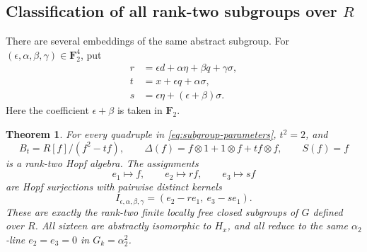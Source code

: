 \documentclass[11pt]{article}
\newtheorem{theorem}{Theorem}[section]
\theoremstyle{remark}
\newcommand{\F}{\mathbf F}
\begin{document}
\subsection{Classification of all rank-two subgroups over
\texorpdfstring{\(R\)}{R}}

There are several embeddings of the same abstract subgroup.  For
\((\epsilon,\alpha,\beta,\gamma)\in\F_2^4\), put
\begin{equation}\label{eq:subgroup-parameters}
\begin{aligned}
 r&=\epsilon d+\alpha\eta+\beta q+\gamma\sigma,\\
 t&=x+\epsilon q+\alpha\sigma,\\
 s&=\epsilon\eta+(\epsilon+\beta)\sigma.
\end{aligned}
\end{equation}
Here the coefficient \(\epsilon+\beta\) is taken in \(\F_2\).

\begin{theorem}\label{thm:subgroup-classification}
For every quadruple in \eqref{eq:subgroup-parameters}, \(t^2=2\), and
\[
 B_t=R[f]/(f^2-tf),\qquad
 \Delta(f)=f\otimes1+1\otimes f+t f\otimes f,\qquad S(f)=f
\]
is a rank-two Hopf algebra.  The assignments
\begin{equation}\label{eq:all-subgroup-maps}
 e_1\mapsto f,\qquad e_2\mapsto rf,\qquad e_3\mapsto sf
\end{equation}
are Hopf surjections with pairwise distinct kernels
\begin{equation}\label{eq:all-subgroup-ideals}
 I_{\epsilon,\alpha,\beta,\gamma}
 =(e_2-re_1,\ e_3-se_1).
\end{equation}
These are exactly the rank-two finite locally free closed subgroups of
\(G\) defined over \(R\).  All sixteen are abstractly isomorphic to
\(H_x\), and all reduce to the same \(\alpha_2\)-line
\(e_2=e_3=0\) in \(G_k=\alpha_2^2\).
\end{theorem}
\end{document}

